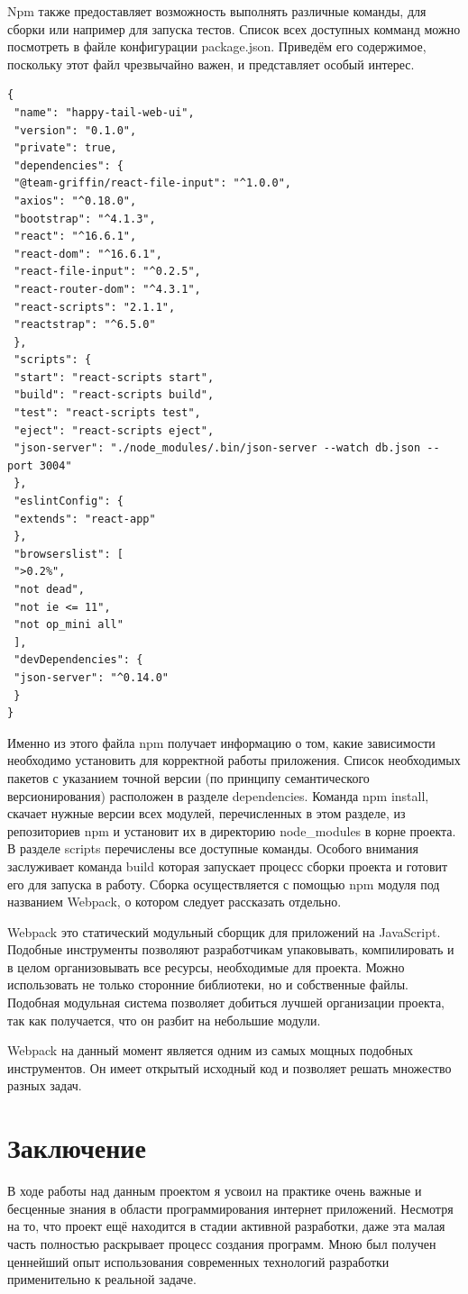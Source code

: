 \documentclass[12pt]{article}
\begin{document}
Npm также предоставляет возможность выполнять различные команды, для сборки или например
для запуска тестов. Список всех доступных комманд можно посмотреть в файле конфигурации
package.json. Приведём его содержимое, поскольку этот файл чрезвычайно важен, и представляет
особый интерес. 

 \footnotesize
\begin{verbatim}
{
 "name": "happy-tail-web-ui",
 "version": "0.1.0",
 "private": true,
 "dependencies": {
 "@team-griffin/react-file-input": "^1.0.0",
 "axios": "^0.18.0",
 "bootstrap": "^4.1.3",
 "react": "^16.6.1",
 "react-dom": "^16.6.1",
 "react-file-input": "^0.2.5",
 "react-router-dom": "^4.3.1",
 "react-scripts": "2.1.1",
 "reactstrap": "^6.5.0"
 },
 "scripts": {
 "start": "react-scripts start",
 "build": "react-scripts build",
 "test": "react-scripts test",
 "eject": "react-scripts eject", 
 "json-server": "./node_modules/.bin/json-server --watch db.json --port 3004"
 },
 "eslintConfig": {
 "extends": "react-app"
 },
 "browserslist": [
 ">0.2%",
 "not dead",
 "not ie <= 11",
 "not op_mini all"
 ],
 "devDependencies": {
 "json-server": "^0.14.0"
 }
}
 \end{verbatim}
   \normalsize
 Именно из этого файла npm получает информацию о том, какие зависимости необходимо
установить для корректной работы приложения. Список необходимых пакетов с указанием точной
версии (по принципу семантического версионирования) расположен в разделе dependencies.
Команда npm install, скачает нужные версии всех модулей, перечисленных в этом разделе,
из репозиториев npm и установит их в директорию node\_modules в корне проекта.
В разделе scripts перечислены все доступные команды. Особого внимания заслуживает команда
build которая запускает процесс сборки проекта и готовит его для запуска в работу. Сборка
осуществляется с помощью npm модуля под названием Webpack, о котором следует рассказать
отдельно.

Webpack это статический модульный сборщик для приложений на JavaScript. Подобные
инструменты позволяют разработчикам упаковывать, компилировать и в целом организовывать
все ресурсы, необходимые для проекта. Можно использовать не только сторонние библиотеки, но
и собственные файлы. Подобная модульная система позволяет добиться лучшей организации
проекта, так как получается, что он разбит на небольшие модули. 

Webpack на данный момент является одним из самых мощных подобных инструментов. Он имеет
открытый исходный код и позволяет решать множество разных задач. 
\section*{Заключение}
В ходе работы над данным проектом я усвоил на практике очень важные и бесценные знания в области программирования интернет приложений. Несмотря на то, что проект ещё находится в стадии активной разработки, даже эта малая часть полностью раскрывает процесс создания программ. Мною был получен ценнейший опыт использования современных технологий разработки применительно к реальной задаче. 
\end{document}
